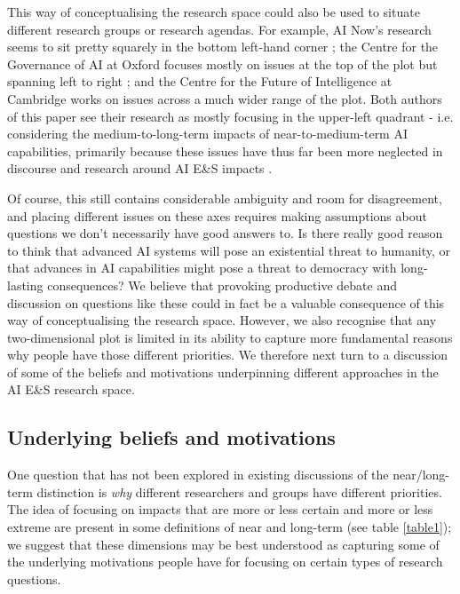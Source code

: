 \documentclass[sigconf]{acmart}
\begin{document}
This way of conceptualising the research space could also be used to situate different research groups or research agendas. For example, AI Now's research seems to sit pretty squarely in the bottom left-hand corner \cite{whittaker_ai_2018}; the Centre for the Governance of AI at Oxford focuses mostly on issues at the top of the plot but spanning left to right \cite{dafoe_ai_2018}; and the Centre for the Future of Intelligence at Cambridge works on issues across a much wider range of the plot. Both authors of this paper see their research as mostly focusing in the upper-left quadrant - i.e. considering the medium-to-long-term impacts of near-to-medium-term AI capabilities, primarily because these issues have thus far been more neglected in discourse and research around AI E\&S impacts \cite{parson_artificial_2019}.

Of course, this still contains considerable ambiguity and room for disagreement, and placing different issues on these axes requires making assumptions about questions we don't necessarily have good answers to. Is there really good reason to think that advanced AI systems will pose an existential threat to humanity, or that advances in AI capabilities might pose a threat to democracy with long-lasting consequences? We believe that provoking productive debate and discussion on questions like these could in fact be a valuable consequence of this way of conceptualising the research space. However, we also recognise that any two-dimensional plot is limited in its ability to capture more fundamental reasons why people have those different priorities. We therefore next turn to a discussion of some of the beliefs and motivations underpinning different approaches in the AI E\&S research space.

\subsection{Underlying beliefs and motivations}

One question that has not been explored in existing discussions of the near/long-term distinction is \textit{why} different researchers and groups have different priorities. The idea of focusing on impacts that are more or less certain and more or less extreme are present in some definitions of near and long-term (see table \ref{table1}); we suggest that these dimensions may be best understood as capturing some of the underlying motivations people have for focusing on certain types of research questions.
\end{document}
